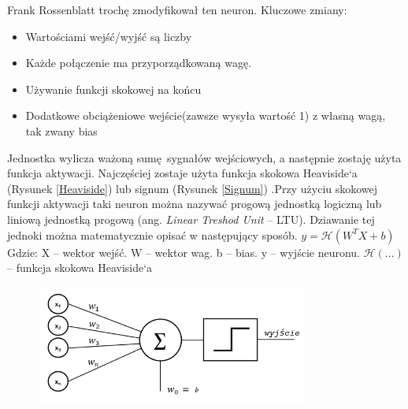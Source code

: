 \documentclass{article}
\begin{document}
Frank Rossenblatt trochę zmodyfikował ten neuron.\newline
Kluczowe zmiany:
\begin{itemize}
	\item Wartościami wejść/wyjść są liczby
	\item Każde połączenie ma przyporządkowaną wagę.
	\item Używanie funkcji skokowej na końcu
	\item Dodatkowe obciążeniowe wejście(zawsze wysyła wartość 1) z własną wagą, tak zwany bias
\end{itemize}
Jednostka wylicza ważoną sumę sygnałów wejściowych, a następnie zostaję użyta funkcja aktywacji. Najczęściej zostaje użyta funkcja skokowa Heaviside`a (Rysunek \ref{Heaviside}) lub signum (Rysunek \ref{Signum}) .Przy użyciu skokowej funkcji aktywacji taki neuron można nazywać progową jednostką logiczną lub liniową jednostką progową (ang. \textit{Linear Treshod Unit} -- LTU). Dziawanie tej jednoki można matematycznie opisać w następujący sposób.\newline\newline
$ y = \mathcal{H}(W^{T}X + b) $\newline \newline
Gdzie: \newline
X -- wektor wejść. \newline
W -- wektor wag. \newline
b -- bias. \newline
y -- wyjście neuronu. \newline
$ \mathcal{H}(...) $ -- funkcja skokowa Heaviside`a\newline

\begin{figure}[H]
	\centering
	\includegraphics[width=0.8\textwidth,keepaspectratio=true]{neuron_rosenblatta}
\end{figure}

\end{document}
